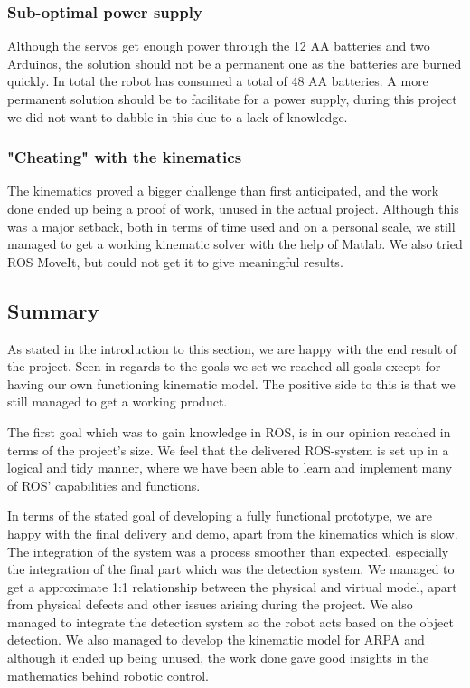 \documentclass[11pt,a4paper, titlepage]{article}
\begin{document}
\subsubsection*{Sub-optimal power supply}
Although the servos get enough power through the 12 AA batteries and two Arduinos, the solution should not be a permanent one as the batteries are burned quickly. In total the robot has consumed a total of 48 AA batteries. A more permanent solution should be to facilitate for a power supply, during this project we did not want to dabble in this due to a lack of knowledge.

\subsubsection*{"Cheating" with the kinematics}
The kinematics proved a bigger challenge than first anticipated, and the work done ended up being a proof of work, unused in the actual project. Although this was a major setback, both in terms of time used and on a personal scale, we still managed to get a working kinematic solver with the help of Matlab. We also tried ROS MoveIt, but could not get it to give meaningful results.

\newpage
\subsection{Summary}
As stated in the introduction to this section, we are happy with the end result of the project. Seen in regards to the goals we set we reached all goals except for having our own functioning kinematic model. The positive side to this is that we still managed to get a working product.

The first goal which was to gain knowledge in ROS, is in our opinion reached in terms of the project's size. We feel that the delivered ROS-system is set up in a logical and tidy manner, where we have been able to learn and implement many of ROS' capabilities and functions.

In terms of the stated goal of developing a fully functional prototype, we are happy with the final delivery and demo, apart from the kinematics which is slow. The integration of the system was a process smoother than expected, especially the integration of the final part which was the detection system. We managed to get a approximate 1:1 relationship between the physical and virtual model, apart from physical defects and other issues arising during the project. We also managed to integrate the detection system so the robot acts based on the object detection. We also managed to develop the kinematic model for ARPA and although it ended up being unused, the work done gave good insights in the mathematics behind robotic control.
\end{document}
